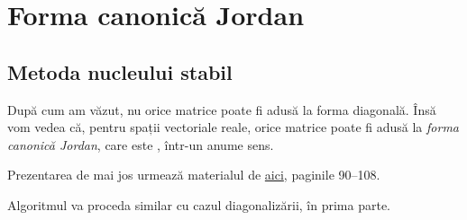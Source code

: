 
\chapter{Forma canonică Jordan}

\section{Metoda nucleului stabil}

După cum am văzut, nu orice matrice poate fi adusă la forma diagonală.
Însă vom vedea că, pentru spații vectoriale reale, orice matrice poate fi
adusă la \emph{forma canonică Jordan}, care este ,
într-un anume sens.

Prezentarea de mai jos urmează materialul de
\href{https://www.scribd.com/doc/233533692/Matematici-Speciale-by-Brinzanescu-Stanasila-1998}{aici}, 
paginile 90--108.

Algoritmul va proceda similar cu cazul diagonalizării, în prima parte.

